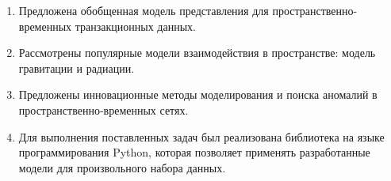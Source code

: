 \begin{enumerate}
  \item Предложена обобщенная модель представления для пространственно-временных транзакционных данных.
  \item Рассмотрены популярные модели взаимодействия в пространстве: модель гравитации и радиации.
  \item Предложены инновационные методы моделирования и поиска аномалий в пространственно-временных сетях.
  \item Для выполнения поставленных задач был реализована библиотека на языке программирования Python, которая позволяет применять разработанные модели для произвольного набора данных.
\end{enumerate}
